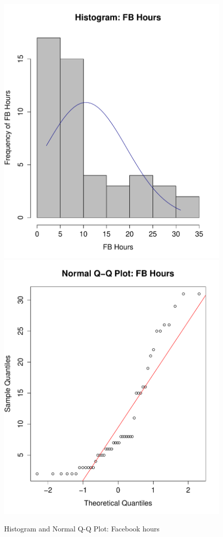 \begin{figure}[H]
\caption{Histogram and Normal Q-Q Plot: Facebook hours}
\centering
\includegraphics[scale=0.35]{./img/hist_fbhours.pdf}
\includegraphics[scale=0.35]{./img/qqplot_fbhours.pdf}
\end{figure}


